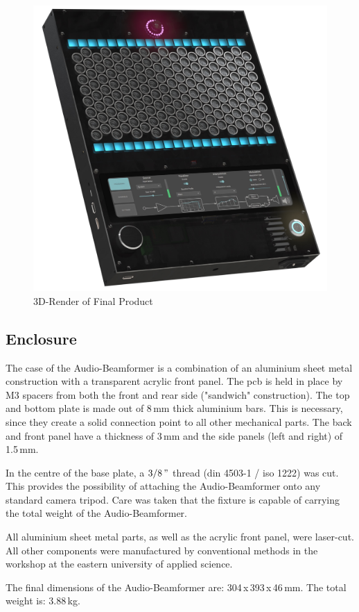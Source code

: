\bigskip
\begin{figure}[h!]
	\centering
	\includegraphics[width=13cm]{images/4_Design/Mechanical/Audio-Beamformer_Case.jpg}
	\vspace{0.0cm}
    \caption{3D-Render of Final Product}
    \label{fig:final_product_render}
\end{figure}
\newpage

\subsection{Enclosure}
The case of the Audio-Beamformer is a combination of an aluminium sheet metal construction with a transparent acrylic front panel. The \acrshort{pcb} is held in place by M3 spacers from both the front and rear side ("sandwich" construction). The top and bottom plate is made out of 8\,mm thick aluminium bars. This is necessary, since they create a solid connection point to all other mechanical parts. The back and front panel have a thickness of 3\,mm and the side panels (left and right) of 1.5\,mm.

In the centre of the base plate, a $3/8\,"$ thread (\acrshort{din} 4503-1 / \acrshort{iso} 1222) was cut. This provides the possibility of attaching the Audio-Beamformer onto any standard camera tripod. Care was taken that the fixture is capable of carrying the total weight of the Audio-Beamformer.

All aluminium sheet metal parts, as well as the acrylic front panel, were laser-cut. All other components were manufactured by conventional methods in the workshop at the eastern university of applied science.

The final dimensions of the Audio-Beamformer are: 304\,x\,393\,x\,46\,mm. The total weight is: 3.88\,kg.


